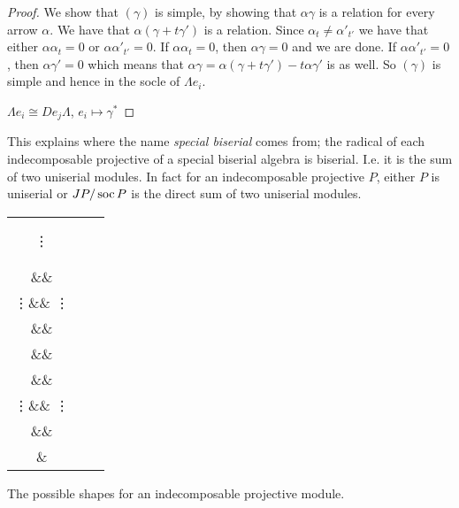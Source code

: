 \begin{prop}
\begin{proof}
		We show that $(\gamma)$ is simple, by showing that $\alpha\gamma$ is a relation for every arrow $\alpha$. We have that $\alpha(\gamma + t\gamma')$ is a relation. Since $\alpha_t \neq \alpha'_{t'}$ we have that either $\alpha\alpha_t = 0$ or $\alpha\alpha'_{t'} = 0$. If $\alpha\alpha_t=0$, then $\alpha\gamma=0$ and we are done. If $\alpha\alpha'_{t'} = 0$, then $\alpha\gamma'=0$ which means that $\alpha\gamma = \alpha(\gamma + t\gamma') - t\alpha\gamma'$ is as well. So $(\gamma)$ is simple and hence in the socle of $\Lambda e_i$.
		

		$\Lambda e_i \cong D e_j \Lambda$, $e_i \mapsto \gamma^*$
		 
	\end{proof} 
\end{prop}

This explains where the name \emph{special biserial} comes from; the radical of each indecomposable projective of a special biserial algebra is biserial. I.e. it is the sum of two uniserial modules. In fact for an indecomposable projective $P$, either $P$ is uniserial or $JP/\operatorname{soc} P$ is the direct sum of two uniserial modules.

\begin{center}
\setlength{\tabcolsep}{30pt}
\begin{tabular}{ccc}
	\begin{tikzcd}
	\bullet\ar[d]\\
	\bullet\ar[d]\\
	\vdots\ar[d]\\
	\bullet\ar[d]\\
	\bullet
	\end{tikzcd}
	&
	\begin{tikzcd}[ampersand replacement=\&, column sep = 10pt]
	\&\bullet\ar[dl]\ar[dr]\\
	\bullet\ar[d] \&\& \bullet\ar[d]\\
	\vdots\ar[d] \&\& \vdots\ar[d]\\
	\bullet \&\& \bullet\ar[d]\\
	\&\&\bullet
	\end{tikzcd}
	&
	\begin{tikzcd}[ampersand replacement=\&, column sep = 10pt]
	\&\bullet\ar[dl]\ar[dr]\\
	\bullet\ar[d] \&\& \bullet\ar[d]\\
	\vdots\ar[d] \&\& \vdots\ar[d]\\
	\bullet\ar[dr] \&\& \bullet\ar[dl]\\
	\&\bullet
	\end{tikzcd}
\end{tabular}

The possible shapes for an indecomposable projective module.
\end{center}

